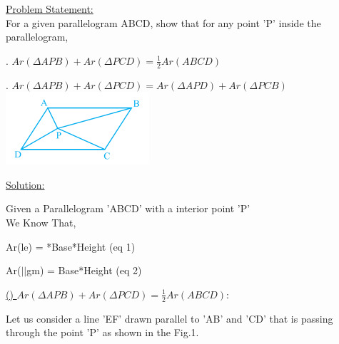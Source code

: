 \documentclass[10pt,a4paper]{report}
\begin{document}
\begin{multicols}{2}

\raggedright \large \underline{Problem Statement:} \normalsize \vspace{5mm}
\\ \hspace{2cm} For a given parallelogram ABCD, show that for any point 'P' inside the parallelogram,\\ \vspace{5mm}\raggedright {}. $Ar(\Delta APB)+Ar(\Delta PCD) = \frac{1}{2}Ar(ABCD)$ \vspace{5mm} \\ 
\raggedright {}. $Ar(\Delta APB)+Ar(\Delta PCD)=Ar(\Delta APD)+Ar(\Delta PCB)$ \vspace{2mm} \\ \centering \includegraphics[scale=1.1]{Question.png} \vspace{2mm} \\ \raggedright \large \underline{Solution:} \normalsize \\ \vspace{1mm} \raggedright Given a Parallelogram 'ABCD' with a interior point 'P'\\ We Know That,\\ \raggedright \hspace{2cm} Ar(\Delta le) = *Base*Height \hspace{1.3cm} (eq 1) \\ \hspace{2cm} \raggedright Ar($||$gm) = Base*Height \hspace{2cm} (eq 2) \vspace{3mm}
\\ \raggedright \underline{() $Ar(\Delta APB)+Ar(\Delta PCD) = \frac{1}{2}Ar(ABCD):$} \\ \vspace{1mm} \raggedright \hspace{1cm} Let us consider a line 'EF' drawn parallel to 'AB' and 'CD' that is passing through the point 'P' as shown in the Fig.1.\\

\end{multicols}
\end{document}
